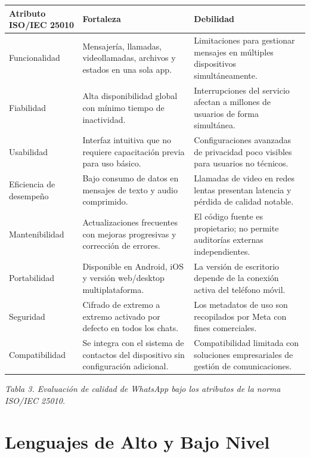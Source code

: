 \documentclass[12pt,a4paper]{article}
\begin{document}
	\begin{center}
		\singlespacing
		\begin{tabular}{|p{3.5cm}|p{5cm}|p{5cm}|}
			\hline
			\textbf{Atributo ISO/IEC 25010} & \textbf{Fortaleza} & \textbf{Debilidad} \\ \hline
			Funcionalidad & Mensajería, llamadas, videollamadas, archivos y estados en una sola app. & Limitaciones para gestionar mensajes en múltiples dispositivos simultáneamente. \\ \hline
			Fiabilidad & Alta disponibilidad global con mínimo tiempo de inactividad. & Interrupciones del servicio afectan a millones de usuarios de forma simultánea. \\ \hline
			Usabilidad & Interfaz intuitiva que no requiere capacitación previa para uso básico. & Configuraciones avanzadas de privacidad poco visibles para usuarios no técnicos. \\ \hline
			Eficiencia de desempeño & Bajo consumo de datos en mensajes de texto y audio comprimido. & Llamadas de video en redes lentas presentan latencia y pérdida de calidad notable. \\ \hline
			Mantenibilidad & Actualizaciones frecuentes con mejoras progresivas y corrección de errores. & El código fuente es propietario; no permite auditorías externas independientes. \\ \hline
			Portabilidad & Disponible en Android, iOS y versión web/desktop multiplataforma. & La versión de escritorio depende de la conexión activa del teléfono móvil. \\ \hline
			Seguridad & Cifrado de extremo a extremo activado por defecto en todos los chats. & Los metadatos de uso son recopilados por Meta con fines comerciales. \\ \hline
			Compatibilidad & Se integra con el sistema de contactos del dispositivo sin configuración adicional. & Compatibilidad limitada con soluciones empresariales de gestión de comunicaciones. \\ \hline
		\end{tabular}
		
		\vspace{0.3cm}
		\textit{Tabla 3. Evaluación de calidad de WhatsApp bajo los atributos de la norma ISO/IEC 25010.}
	\end{center}
	
	\doublespacing
	
	\section{Lenguajes de Alto y Bajo Nivel}
	
\end{document}
